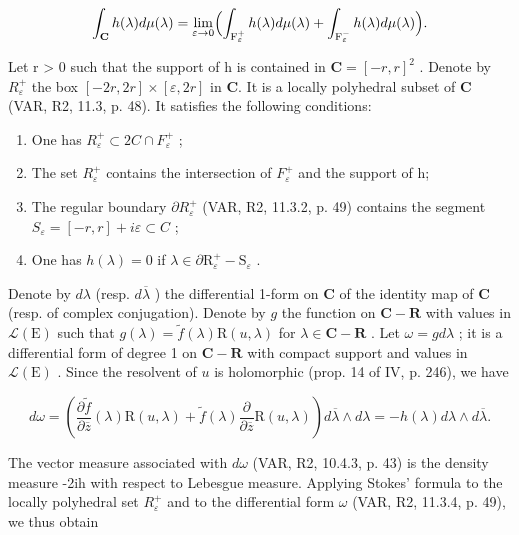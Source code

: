 \[
\int_ {\mathbf {C}} h (\lambda) d \mu (\lambda) = \lim _ {\varepsilon \to 0} \Bigl (\int_ {\mathrm{F} _ {\varepsilon} ^ {+}} h (\lambda) d \mu (\lambda) + \int_ {\mathrm{F} _ {\varepsilon} ^ {-}} h (\lambda) d \mu (\lambda) \Bigr).
\]

Let r > 0 such that the support of h is contained in \(\mathbf{C} = [-r, r]^{2}\) . Denote by \(R_{\varepsilon}^{+}\) the box \([-2r, 2r] \times [\varepsilon, 2r]\) in \(\mathbf{C}\). It is a locally polyhedral subset of \(\mathbf{C}\) (VAR, R2, 11.3, p. 48). It satisfies the following conditions:

\begin{enumerate}
\def\labelenumi{(\roman{enumi})}
\item
  One has \(R_{\varepsilon}^{+} \subset 2C \cap F_{\varepsilon}^{+}\) ;
\item
  The set \(R_{\varepsilon}^{+}\) contains the intersection of \(F_{\varepsilon}^{+}\) and the support of h;
\item
  The regular boundary \(\partial R_{\varepsilon}^{+}\) (VAR, R2, 11.3.2, p. 49) contains the segment \(S_{\varepsilon} = [-r, r] + i\varepsilon \subset C\) ;
\item
  One has \(h(\lambda) = 0\) if \(\lambda \in \partial \mathrm{R}_{\varepsilon}^{+} - \mathrm{S}_{\varepsilon}\) .
\end{enumerate}

Denote by \(d\lambda\) (resp. \(d\overline{\lambda}\) ) the differential 1-form on \(\mathbf{C}\) of the identity map of \(\mathbf{C}\) (resp. of complex conjugation). Denote by \(g\) the function on \(\mathbf{C} - \mathbf{R}\) with values in \(\mathcal{L}(\mathrm{E})\) such that \(g(\lambda) = \widetilde{f}(\lambda)\mathrm{R}(u,\lambda)\) for \(\lambda \in \mathbf{C} - \mathbf{R}\) . Let \(\omega = g d\lambda\) ; it is a differential form of degree 1 on \(\mathbf{C} - \mathbf{R}\) with compact support and values in \(\mathcal{L}(\mathrm{E})\) . Since the resolvent of \(u\) is holomorphic (prop. 14 of IV, p. 246), we have

\[
d \omega = \left(\frac {\partial \widetilde {f}}{\partial \overline {{z}}} (\lambda) \mathrm{R} (u, \lambda) + \widetilde {f} (\lambda) \frac {\partial}{\partial \overline {{z}}} \mathrm{R} (u, \lambda)\right) d \overline {{\lambda}} \wedge d \lambda = - h (\lambda) d \lambda \wedge d \overline {{\lambda}}.
\]

The vector measure associated with \(d\omega\) (VAR, R2, 10.4.3, p. 43) is the density measure -2ih with respect to Lebesgue measure. Applying Stokes' formula to the locally polyhedral set \(R_{\varepsilon}^{+}\) and to the differential form \(\omega\) (VAR, R2, 11.3.4, p. 49), we thus obtain

